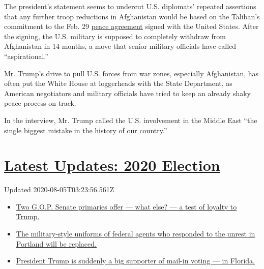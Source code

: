 The president's statement seems to undercut U.S. diplomats' repeated
assertions that any further troop reductions in Afghanistan would be
based on the Taliban's commitment to the Feb. 29
\href{https://www.nytimes3xbfgragh.onion/2020/02/29/world/asia/us-taliban-deal.html}{peace
agreement} signed with the United States. After the signing, the U.S.
military is supposed to completely withdraw from Afghanistan in 14
months, a move that senior military officials have called
``aspirational.''

Mr. Trump's drive to pull U.S. forces from war zones, especially
Afghanistan, has often put the White House at loggerheads with the State
Department, as American negotiators and military officials have tried to
keep an already shaky peace process on track.

In the interview, Mr. Trump called the U.S. involvement in the Middle
East ``the single biggest mistake in the history of our country.''

\hypertarget{latest-updates-2020-election}{%
\section{\texorpdfstring{\href{https://www.nytimes3xbfgragh.onion/2020/08/04/us/elections/primary-election-michigan-arizona-kansas.html?action=click\&pgtype=Article\&state=default\&region=MAIN_CONTENT_1\&context=storylines_live_updates}{Latest
Updates: 2020
Election}}{Latest Updates: 2020 Election}}\label{latest-updates-2020-election}}

Updated 2020-08-05T03:23:56.561Z

\begin{itemize}
\tightlist
\item
  \href{https://www.nytimes3xbfgragh.onion/2020/08/04/us/elections/primary-election-michigan-arizona-kansas.html?action=click\&pgtype=Article\&state=default\&region=MAIN_CONTENT_1\&context=storylines_live_updates\#link-3924dd44}{Two
  G.O.P. Senate primaries offer --- what else? --- a test of loyalty to
  Trump.}
\item
  \href{https://www.nytimes3xbfgragh.onion/2020/08/04/us/elections/primary-election-michigan-arizona-kansas.html?action=click\&pgtype=Article\&state=default\&region=MAIN_CONTENT_1\&context=storylines_live_updates\#link-62a8e06b}{The
  military-style uniforms of federal agents who responded to the unrest
  in Portland will be replaced.}
\item
  \href{https://www.nytimes3xbfgragh.onion/2020/08/04/us/elections/primary-election-michigan-arizona-kansas.html?action=click\&pgtype=Article\&state=default\&region=MAIN_CONTENT_1\&context=storylines_live_updates\#link-32b39e33}{President
  Trump is suddenly a big supporter of mail-in voting --- in Florida.}
\end{itemize}

